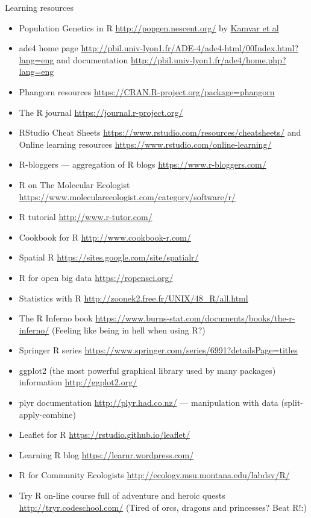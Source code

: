 \documentclass[compress, ucs, xelatex, 11pt, xcolor=svgnames,
  hyperref={
    bookmarks=true,
    unicode=true,
    colorlinks=true,
    pdftitle={Molecular data in R},
    plainpages=false,
    pdfauthor={Vojtech Zeisek},
    pdfsubject={Course about phylogeny and evolution in R},
    pdfcreator={XeLaTeX},
    pdfkeywords={R, evolution, phylogeny, molecular data},
    linkcolor=Tomato,
    anchorcolor=SaddleBrown,
    citecolor=Goldenrod,
    filecolor=DarkMagenta,
    menucolor=Sienna,
    urlcolor=DarkTurquoise,
    pdftex},
  url={hyphens, lowtilde} %
  ]{beamer}
\begin{document}
\begin{frame}[allowframebreaks]{Learning resources}
\begin{itemize}
    \item Population Genetics in R \url{http://popgen.nescent.org/} by \href{http://onlinelibrary.wiley.com/doi/10.1111/1755-0998.12558/abstract}{Kamvar et al}
    \item ade4 home page \url{http://pbil.univ-lyon1.fr/ADE-4/ade4-html/00Index.html?lang=eng} and documentation \url{http://pbil.univ-lyon1.fr/ade4/home.php?lang=eng}
    \item Phangorn resources \url{https://CRAN.R-project.org/package=phangorn}
    \item The R journal \url{https://journal.r-project.org/}
    \item RStudio Cheat Sheets \url{https://www.rstudio.com/resources/cheatsheets/} and Online learning resources \url{https://www.rstudio.com/online-learning/}
    \item R-bloggers --- aggregation of R blogs \url{https://www.r-bloggers.com/}
    \item R on The Molecular Ecologist \url{https://www.molecularecologist.com/category/software/r/}
    \item R tutorial \url{http://www.r-tutor.com/}
    \item Cookbook for R  \url{http://www.cookbook-r.com/}
    \item Spatial R \url{https://sites.google.com/site/spatialr/}
    \item R for open big data \url{https://ropensci.org/}
    \item Statistics with R \url{http://zoonek2.free.fr/UNIX/48_R/all.html}
    \item The R Inferno book \url{https://www.burns-stat.com/documents/books/the-r-inferno/} (Feeling like being in hell when using R?)
    \item Springer R series \url{https://www.springer.com/series/6991?detailsPage=titles}
    \item ggplot2 (the most powerful graphical library used by many packages) information \url{http://ggplot2.org/}
    \item plyr documentation \url{http://plyr.had.co.nz/} --- manipulation with data (split-apply-combine)
    \item Leaflet for R \url{https://rstudio.github.io/leaflet/}
    \item Learning R blog \url{https://learnr.wordpress.com/}
    \item R for Community Ecologists \url{http://ecology.msu.montana.edu/labdsv/R/}
    \item Try R on-line course full of adventure and heroic quests \url{http://tryr.codeschool.com/} (Tired of orcs, dragons and princesses? Beat R!:)

\end{itemize}
\end{frame}
\end{document}
